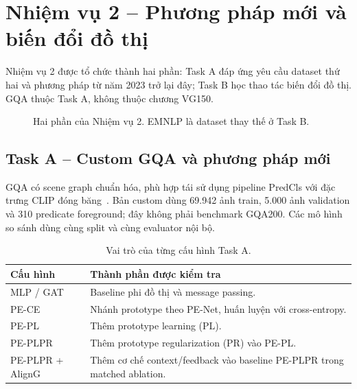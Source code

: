 
\section{Nhiệm vụ 2 -- Phương pháp mới và biến đổi đồ thị}
Nhiệm vụ 2 được tổ chức thành hai phần: Task A đáp ứng yêu cầu dataset thứ hai
và phương pháp từ năm 2023 trở lại đây; Task B học thao tác biến đổi đồ thị.
GQA thuộc Task A, không thuộc chương VG150.

\begin{figure}[!t]\centering
{}
\caption{Hai phần của Nhiệm vụ 2. EMNLP là dataset thay thế ở Task B.}
\end{figure}

\subsection{Task A -- Custom GQA và phương pháp mới}
GQA có scene graph chuẩn hóa, phù hợp tái sử dụng pipeline PredCls với
đặc trưng CLIP đóng băng~\cite{hudson2019gqa}. Bản custom dùng 69.942 ảnh
train, 5.000 ảnh validation và 310 predicate foreground; đây không phải
benchmark GQA200. Các mô hình so sánh dùng cùng split và cùng evaluator nội bộ.

\begin{table}[!ht]\centering\small
\caption{Vai trò của từng cấu hình Task A.}\label{tab:gqamethod}
\begin{tabularx}{\linewidth}{@{}>{\raggedright\arraybackslash}p{26mm}X@{}}\toprule
Cấu hình & Thành phần được kiểm tra\\\midrule
MLP / GAT & Baseline phi đồ thị và message passing.\\
PE-CE & Nhánh prototype theo PE-Net, huấn luyện với cross-entropy.\\
PE-PL & Thêm prototype learning (PL).\\
PE-PLPR & Thêm prototype regularization (PR) vào PE-PL.\\
PE-PLPR + AlignG & Thêm cơ chế context/feedback vào baseline PE-PLPR trong matched ablation.\\
\bottomrule\end{tabularx}\end{table}

